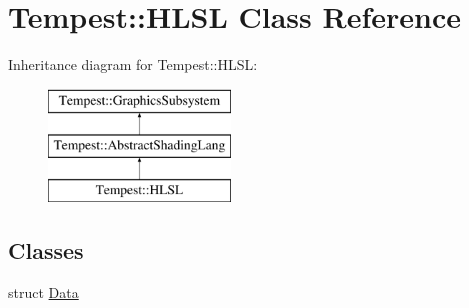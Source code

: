 \hypertarget{class_tempest_1_1_h_l_s_l}{\section{Tempest\+:\+:H\+L\+S\+L Class Reference}
\label{class_tempest_1_1_h_l_s_l}
}
Inheritance diagram for Tempest\+:\+:H\+L\+S\+L\+:\begin{figure}[H]
\begin{center}
\leavevmode
\includegraphics[height=3.000000cm]{class_tempest_1_1_h_l_s_l}
\end{center}
\end{figure}
\subsection*{Classes}
\begin{DoxyCompactItemize}
\item 
struct \hyperlink{struct_h_l_s_l_1_1_data}{Data}
\end{DoxyCompactItemize}
